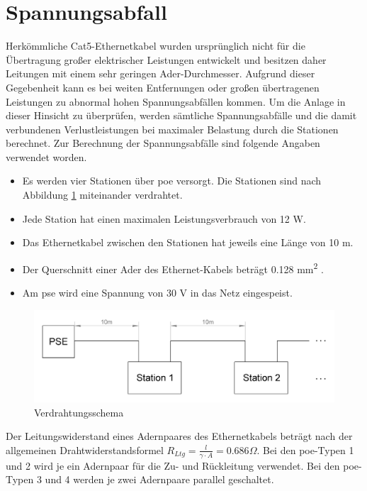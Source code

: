 \section{Spannungsabfall}
Herkömmliche Cat5-Ethernetkabel wurden ursprünglich nicht für die Übertragung großer elektrischer Leistungen entwickelt und besitzen daher Leitungen mit einem sehr geringen Ader-Durchmesser.
Aufgrund dieser Gegebenheit kann es bei weiten Entfernungen oder großen übertragenen Leistungen zu abnormal hohen Spannungsabfällen kommen.
Um die Anlage in dieser Hinsicht zu überprüfen, werden sämtliche Spannungsabfälle und die damit verbundenen Verlustleistungen bei maximaler Belastung durch die Stationen berechnet.
Zur Berechnung der Spannungsabfälle sind folgende Angaben verwendet worden.
\begin{itemize}
	\item Es werden vier Stationen über \ac{poe} versorgt.
	Die Stationen sind nach Abbildung \ref{fig:poe-verdrahtung} miteinander verdrahtet.
	\item Jede Station hat einen maximalen Leistungsverbrauch von 12 W.
	\item Das Ethernetkabel zwischen den Stationen hat jeweils eine Länge von 10 m.
	\item Der Querschnitt einer Ader des Ethernet-Kabels beträgt 0.128 mm\textsuperscript{2} \cite[vgl.][]{lapp-cat5-datasheet}.
	\item Am \ac{pse} wird eine Spannung von 30 V in das Netz eingespeist.
\end{itemize}
\begin{figure}[htbp!]
	\centering
	\includegraphics[width=.9\linewidth]{images/berechnung/poe_verdrahtung.png}
	\caption{Verdrahtungsschema}
	\label{fig:poe-verdrahtung}
\end{figure}
Der Leitungswiderstand eines Adernpaares des Ethernetkabels beträgt nach der allgemeinen Drahtwiderstandsformel $R_{Ltg}=\frac{l}{\gamma\cdot A}=0.686\Omega$.
Bei den \ac{poe}-Typen 1 und 2 wird je ein Adernpaar für die Zu- und Rückleitung verwendet.
Bei den \ac{poe}-Typen 3 und 4 werden je zwei Adernpaare parallel geschaltet.\par

